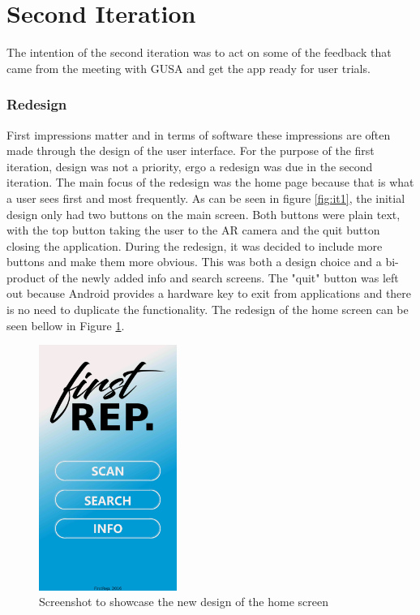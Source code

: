 \documentclass{l4proj}
\begin{document}
\section{Second Iteration}
The intention of the second iteration was to act on some of the feedback that came from the meeting with GUSA and get the app ready for user trials.

\subsubsection{Redesign}
First impressions matter and in terms of software these impressions are often made through the design of the user interface. For the purpose of the first iteration, design was not a priority, ergo a redesign was due in the second iteration. The main focus of the redesign was the home page because that is what a user sees first and most frequently. As can be seen in figure \ref{fig:it1}, the initial design only had two buttons on the main screen. Both buttons were plain text, with the top button taking the user to the AR camera and the quit button closing the application. During the redesign, it was decided to include more buttons and make them more obvious. This was both a design choice and a bi-product of the newly added info and search screens. The "quit" button was left out because Android provides a hardware key to exit from applications and there is no need to duplicate the functionality. The redesign of the home screen can be seen bellow in Figure \ref{fig:it2_home}.

\begin{figure}[h]
\centering
\includegraphics[height=8cm]{images/redesigned_homescreen.png}
\caption{Screenshot to showcase the new design of the home screen}
\label{fig:it2_home}
\end{figure}
\end{document}

